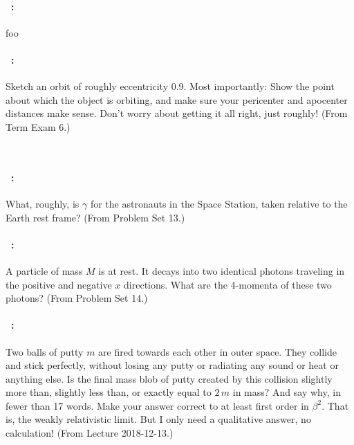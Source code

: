 \documentclass[12pt]{article} 
\begin{document}
\vfill

\paragraph{\problemname~\theproblem:}%
foo

\vfill

\paragraph{\problemname~\theproblem:}%
Sketch an orbit of roughly eccentricity 0.9. Most importantly: Show the
point about which the object is orbiting, and make sure your pericenter
and apocenter distances make sense. Don't worry about getting it all right,
just roughly!
(From Term Exam 6.)

\vfill
~
\clearpage

\paragraph{\problemname~\theproblem:}%
What, roughly, is $\gamma$ for the astronauts in the Space Station,
taken relative to the Earth rest frame?
(From Problem Set 13.)

\vfill

\paragraph{\problemname~\theproblem:}%
A particle of mass $M$ is at rest. It decays into two identical
photons traveling in the positive and negative $x$ directions.
What are the 4-momenta of these two photons?
(From Problem Set 14.)

\vfill

\paragraph{\problemname~\theproblem:}%
Two balls of putty $m$ are fired towards each other in outer space.
They collide and stick perfectly, without losing any putty or
radiating any sound or heat or anything else. Is the final mass blob
of putty created by this collision slightly more than, slightly less
than, or exactly equal to $2\,m$ in mass? And say why, in fewer than
17 words. Make your answer correct to at least first order in
$\beta^2$. That is, the weakly relativistic limit. But I only need
a qualitative answer, no calculation! (From Lecture
2018-12-13.)

\vfill
~
\end{document}
